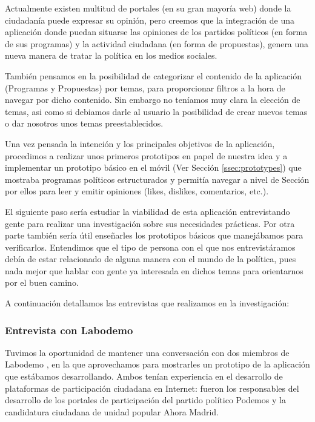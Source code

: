 Actualmente existen multitud de portales (en su gran mayoría web) donde la ciudadanía puede expresar su opinión, pero creemos que la integración de una aplicación donde puedan situarse las opiniones de los partidos políticos (en forma de sus programas) y la actividad ciudadana (en forma de propuestas), genera una nueva manera de tratar la política en los medios sociales.

También pensamos en la posibilidad de categorizar el contenido de la aplicación (Programas y Propuestas) por temas, para proporcionar filtros a la hora de navegar por dicho contenido. Sin embargo no teníamos muy clara la elección de temas, asi como si debiamos darle al usuario la posibilidad de crear nuevos temas o dar nosotros unos temas preestablecidos.
 
Una vez pensada la intención y los principales objetivos de la aplicación, procedimos a realizar unos primeros prototipos en papel de nuestra idea y a implementar un prototipo básico en el móvil (Ver Sección \ref{ssec:prototypes}) que mostraba programas políticos estructurados y permitía navegar a nivel de Sección por ellos para leer y emitir opiniones (likes, dislikes, comentarios, etc.).  

 El siguiente paso sería estudiar la viabilidad de esta aplicación entrevistando gente para realizar una investigación sobre sus necesidades prácticas. Por otra parte también sería útil enseñarles los prototipos básicos que manejábamos para verificarlos. Entendimos que el tipo de persona con el que nos entrevistáramos debía de estar relacionado de alguna manera con el mundo de la política, pues nada mejor que hablar con gente ya interesada en dichos temas para orientarnos por el buen camino.

A continuación detallamos las entrevistas que realizamos en la investigación:

\subsubsection{Entrevista con Labodemo}

Tuvimos la oportunidad de mantener una conversación con dos miembros de Labodemo \cite{ref:labodemo}, en la que aprovechamos para mostrarles un prototipo de la aplicación que estábamos desarrollando. Ambos tenían experiencia en el desarrollo de plataformas de participación ciudadana en Internet: fueron los responsables del desarrollo de los portales de participación del partido político Podemos y la candidatura ciudadana de unidad popular Ahora Madrid.

